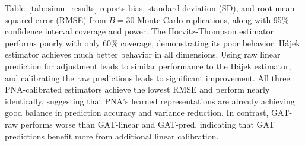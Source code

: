 \documentclass{article}
\theoremstyle{plain}
\theoremstyle{definition}
\theoremstyle{remark}
\begin{document}
Table~\ref{tab::simu_results} reports bias, standard deviation (SD), and root mean squared error (RMSE) from $B=30$ Monte Carlo replications, along with 95\% confidence interval coverage and power. The Horvitz-Thompson estimator performs poorly with only 60\% coverage, demonstrating its poor behavior. H\'{a}jek estimator achieves much better behavior in all dimensions. Using raw linear prediction for adjustment leads to similar performance to the H\'{a}jek estimator, and calibrating the raw predictions leads to significant improvement. All three PNA-calibrated estimators achieve the lowest RMSE and perform nearly identically, suggesting that PNA's learned representations are already achieving good balance in prediction accuracy and variance reduction. In contrast, GAT-raw performs worse than GAT-linear and GAT-pred, indicating that GAT predictions benefit more from additional linear calibration.
\end{document}
